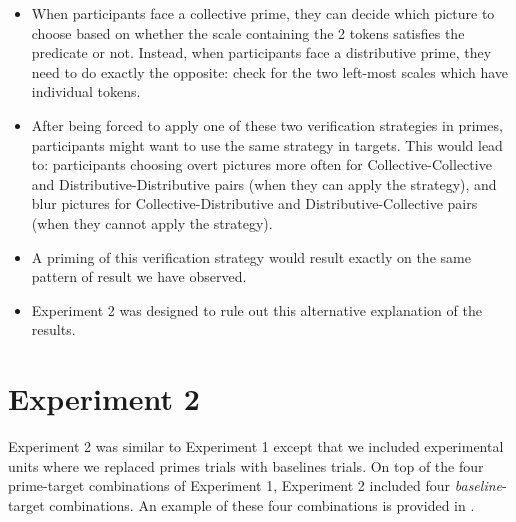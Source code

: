 \documentclass[a4paper]{article}
\begin{document}
\begin{itemize}

\item When participants face a collective prime, they can decide which picture to choose based on whether the scale containing the 2 tokens satisfies the predicate or not. Instead, when participants face a distributive prime, they need to do exactly the opposite: check for the two left-most scales which have individual tokens. 

\item After being forced to apply one of these two verification strategies in primes, participants might want to use the same strategy in targets. This would lead to: participants choosing overt pictures more often for Collective-Collective and Distributive-Distributive pairs (when they can apply the strategy), and blur pictures for Collective-Distributive and Distributive-Collective pairs (when they cannot apply the strategy). 

\item A priming of this verification strategy would result exactly on the same pattern of result we have observed. 

\item Experiment 2 was designed to rule out this alternative explanation of the results. 

\end{itemize}




\section{Experiment 2}

Experiment 2 was similar to Experiment 1 except that we included experimental units where we replaced primes trials with baselines trials. On top of the four prime-target combinations of Experiment 1, Experiment 2 included four \emph{baseline}-target combinations. An example of these four combinations is provided in . 
\end{document}
